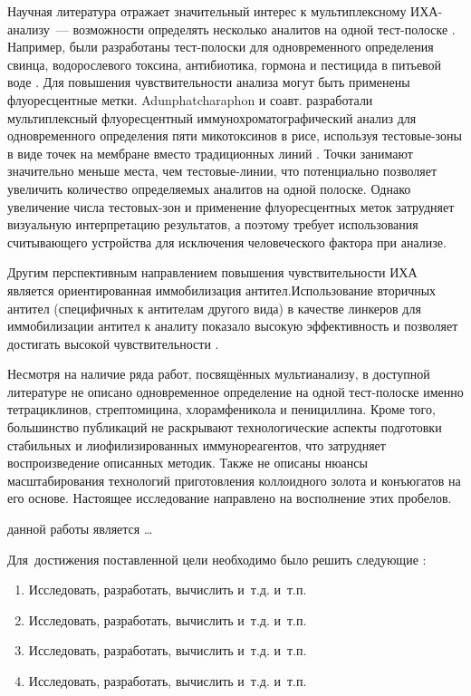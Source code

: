 Научная литература отражает значительный интерес к мультиплексному ИХА-анализу~--- возможности определять несколько аналитов на одной тест-полоске \cite{di2021ten}. Например, были разработаны тест-полоски для одновременного определения свинца, водорослевого токсина, антибиотика, гормона и пестицида в питьевой воде \cite{xing2015ultrasensitive}. Для повышения чувствительности анализа могут быть применены флуоресцентные метки. Adunphatcharaphon и соавт. разработали мультиплексный флуоресцентный иммунохроматографический анализ для одновременного определения пяти микотоксинов в рисе, используя тестовые-зоны в виде точек на мембране вместо традиционных линий \cite{adunphatcharaphon2024multiplex}. Точки занимают значительно меньше места, чем тестовые-линии, что потенциально позволяет увеличить количество определяемых аналитов на одной полоске. Однако увеличение числа тестовых-зон и применение флуоресцентных меток затрудняет визуальную интерпретацию результатов, а поэтому требует использования считывающего устройства для исключения человеческого фактора при анализе.

Другим перспективным направлением повышения чувствительности ИХА является ориентированная иммобилизация антител.Использование вторичных антител (специфичных к антителам другого вида) в качестве линкеров  для иммобилизации антител к аналиту показало высокую эффективность и позволяет достигать высокой чувствительности \cite{barshevskaya2023modular,Barshevskaya2025,Sotnikov2022double}.

Несмотря на наличие ряда работ, посвящённых мультианализу, в доступной литературе не описано одновременное определение на одной тест-полоске именно тетрациклинов, стрептомицина, хлорамфеникола и пенициллина. Кроме того, большинство публикаций не раскрывают технологические аспекты подготовки стабильных и лиофилизированных иммунореагентов, что затрудняет воспроизведение описанных методик. Также не описаны нюансы масштабирования технологий приготовления коллоидного золота и конъюгатов на его основе. Настоящее исследование направлено на восполнение этих пробелов.


{\aim} данной работы является \ldots

Для~достижения поставленной цели необходимо было решить следующие {\tasks}:
\begin{enumerate}[beginpenalty=10000] %
  \item Исследовать, разработать, вычислить и~т.\:д. и~т.\:п.
  \item Исследовать, разработать, вычислить и~т.\:д. и~т.\:п.
  \item Исследовать, разработать, вычислить и~т.\:д. и~т.\:п.
  \item Исследовать, разработать, вычислить и~т.\:д. и~т.\:п.
\end{enumerate}


